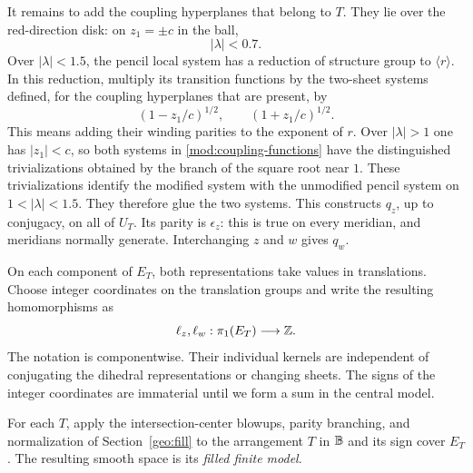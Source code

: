 It remains to add the coupling hyperplanes that belong to $T$.
They lie over the red-direction disk: on $z_1=\pm c$ in the ball,
\[
 |\lambda|<0.7.
\]
Over $|\lambda|<1.5$, the pencil local system has a reduction of
structure group to $\langle r\rangle$.  In this reduction, multiply
its transition functions by the two-sheet systems defined, for the
coupling hyperplanes that are present, by
\begin{equation}\label{mod:coupling-functions}
 (1-z_1/c)^{1/2},\qquad (1+z_1/c)^{1/2}.
\end{equation}
This means adding their winding parities to the exponent of $r$.
Over $|\lambda|>1$ one has $|z_1|<c$, so both systems in
\eqref{mod:coupling-functions} have the distinguished trivializations
obtained by the branch of the square root near $1$.  These
trivializations identify the modified system with the unmodified
pencil system on $1<|\lambda|<1.5$.  They therefore glue the two
systems.  This constructs $q_z$, up to conjugacy, on all of $U_T$.
Its parity is $\epsilon_z$: this is true on every meridian, and
meridians normally generate.  Interchanging $z$ and $w$ gives $q_w$.

On each component of $E_T$, both representations take values in
translations.  Choose integer coordinates on the translation groups
and write the resulting homomorphisms as
\[
 \ell_z,\ell_w:\pi_1(E_T)\longrightarrow\mathbb Z.
\]
The notation is componentwise.  Their individual kernels are
independent of conjugating the dihedral representations or changing
sheets.  The signs of the integer coordinates are immaterial until
we form a sum in the central model.

For each $T$, apply the intersection-center blowups, parity branching,
and normalization of Section~\ref{geo:fill} to the arrangement $T$ in
$\mathbb B$ and its sign cover $E_T$.  The resulting smooth space is its
\emph{filled finite model}.

